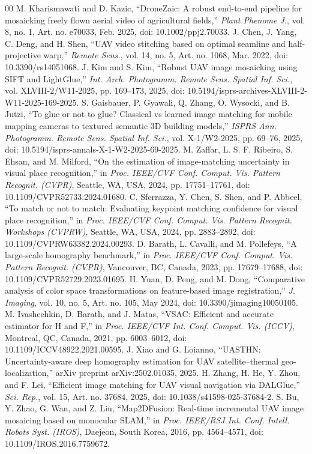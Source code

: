 \documentclass[conference]{IEEEtran}
\begin{document}
\begin{thebibliography}{00}
 M. Kharismawati and D. Kazic, ``DroneZaic: A robust end-to-end pipeline for mosaicking freely flown aerial video of agricultural fields,'' \emph{Plant Phenome J.}, vol. 8, no. 1, Art. no. e70033, Feb. 2025, doi: 10.1002/ppj2.70033.
 J. Chen, J. Yang, C. Deng, and H. Shen, ``UAV video stitching based on optimal seamline and half-projective warp,'' \emph{Remote Sens.}, vol. 14, no. 5, Art. no. 1068, Mar. 2022, doi: 10.3390/rs14051068.
 J. Kim and S. Kim, ``Robust UAV image mosaicking using SIFT and LightGlue,'' \emph{Int. Arch. Photogramm. Remote Sens. Spatial Inf. Sci.}, vol. XLVIII-2/W11-2025, pp. 169--173, 2025, doi: 10.5194/isprs-archives-XLVIII-2-W11-2025-169-2025.
 S. Gaisbauer, P. Gyawali, Q. Zhang, O. Wysocki, and B. Jutzi, ``To glue or not to glue? Classical vs learned image matching for mobile mapping cameras to textured semantic 3D building models,'' \emph{ISPRS Ann. Photogramm. Remote Sens. Spatial Inf. Sci.}, vol. X-1/W2-2025, pp. 69--76, 2025, doi: 10.5194/isprs-annals-X-1-W2-2025-69-2025.
 M. Zaffar, L. S. F. Ribeiro, S. Ehsan, and M. Milford, ``On the estimation of image-matching uncertainty in visual place recognition,'' in \emph{Proc. IEEE/CVF Conf. Comput. Vis. Pattern Recognit. (CVPR)}, Seattle, WA, USA, 2024, pp. 17751--17761, doi: 10.1109/CVPR52733.2024.01680.
 C. Sferrazza, Y. Chen, S. Shen, and P. Abbeel, ``To match or not to match: Evaluating keypoint matching confidence for visual place recognition,'' in \emph{Proc. IEEE/CVF Conf. Comput. Vis. Pattern Recognit. Workshops (CVPRW)}, Seattle, WA, USA, 2024, pp. 2883--2892, doi: 10.1109/CVPRW63382.2024.00293.
 D. Barath, L. Cavalli, and M. Pollefeys, ``A large-scale homography benchmark,'' in \emph{Proc. IEEE/CVF Conf. Comput. Vis. Pattern Recognit. (CVPR)}, Vancouver, BC, Canada, 2023, pp. 17679--17688, doi: 10.1109/CVPR52729.2023.01695.
 H. Yuan, D. Peng, and M. Dong, ``Comparative analysis of color space transformations on feature-based image registration,'' \emph{J. Imaging}, vol. 10, no. 5, Art. no. 105, May 2024, doi: 10.3390/jimaging10050105.
 M. Ivashechkin, D. Barath, and J. Matas, ``VSAC: Efficient and accurate estimator for H and F,'' in \emph{Proc. IEEE/CVF Int. Conf. Comput. Vis. (ICCV)}, Montreal, QC, Canada, 2021, pp. 6003--6012, doi: 10.1109/ICCV48922.2021.00595.
 J. Xiao and G. Loianno, ``UASTHN: Uncertainty-aware deep homography estimation for UAV satellite--thermal geo-localization,'' arXiv preprint arXiv:2502.01035, 2025.
 H. Zhang, H. He, Y. Zhou, and F. Lei, ``Efficient image matching for UAV visual navigation via DALGlue,'' \emph{Sci. Rep.}, vol. 15, Art. no. 37684, 2025, doi: 10.1038/s41598-025-37684-2.
 S. Bu, Y. Zhao, G. Wan, and Z. Liu, ``Map2DFusion: Real-time incremental UAV image mosaicing based on monocular SLAM,'' in \emph{Proc. IEEE/RSJ Int. Conf. Intell. Robots Syst. (IROS)}, Daejeon, South Korea, 2016, pp. 4564--4571, doi: 10.1109/IROS.2016.7759672.
\end{thebibliography}
\end{document}
